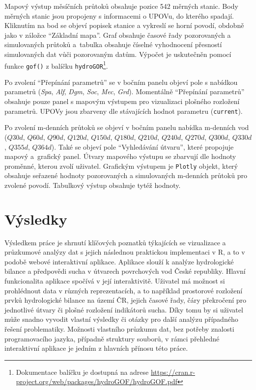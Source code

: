 \documentclass[12pt,]{article}
\let\rmarkdownfootnote\footnote%
\def\footnote{\protect\rmarkdownfootnote}
\begin{document}
\vspace*{-0.3cm}

\qquad Mapový výstup měsíčních průtoků obsahuje pozice 542 měrných
stanic. Body měrných stanic jsou propojeny s informacemi o UPOVu, do
kterého spadají. Kliknutím na bod se objeví popisek stanice a vykreslí
se horní povodí, obdobně jako v záložce \enquote{Základní mapa}. Graf
obsahuje časové řady pozorovaných a simulovaných průtoků a~tabulka
obsahuje číselné vyhodnocení přesností simulovaných dat vůči pozorovaným
datům. Výpočet je uskutečněn pomocí funkce \texttt{gof()} z balíčku
\texttt{hydroGOR}\footnote{Dokumentace balíčku je dostupná na adrese
  \url{https://cran.r-project.org/web/packages/hydroGOF/hydroGOF.pdf}}.

\qquad Po zvolení \enquote{Přepínání parametrů} se v bočním panelu
objeví pole s nabídkou parametrů (\emph{Spa}, \emph{Alf}, \emph{Dgm},
\emph{Soc}, \emph{Mec}, \emph{Grd}). Momentálně \enquote{Přepínání
parametrů} obsahuje pouze panel s mapovým výstupem pro vizualizaci
plošného rozložení parametrů. UPOVy jsou zbarveny dle stávajících hodnot
parametru (\texttt{current}).

\qquad Po zvolení m-denních průtoků se objeví v bočním panelu nabídka
m-denních vod (\(Q30d\), \(Q60d\), \(Q90d\), \(Q120d\), \(Q150d\),
\(Q180d\), \(Q210d\), \(Q240d\), \(Q270d\), \(Q300d\), \(Q330d\),
\(Q355d\), \(Q364d\)). Také se objeví pole \enquote{Vyhledávání útvaru},
které propojuje mapový a~grafický panel. Útvary mapového výstupu se
zbarvují dle hodnoty proměnné, kterou zvolí uživatel. Grafickým výstupem
je \texttt{Plotly} objekt, který obsahuje seřazené hodnoty pozorovaných
a simulovaných m-denních průtoků pro zvolené povodí. Tabulkový výstup
obsahuje tytéž hodnoty.

\newpage

\section*{Výsledky}\label{vysledky}

\qquad Výsledkem práce je shrnutí klíčových poznatků týkajících se
vizualizace a průzkumové analýzy dat s jejich následnou praktickou
implementaci v R, a to v podobě webové interaktivní aplikace. Aplikace
slouží k analýze hydrologické bilance a předpovědi sucha v útvarech
povrchových vod České republiky. Hlavní funkcionalita aplikace spočívá v
její interaktivitě. Uživatel má možnost si prohlédnout data v různých
reprezentacích, a to například prostorové rozložení prvků hydrologické
bilance na území ČR, jejich časové řady, čáry překročení pro jednotlivé
útvary či plošné rozložení indikátorů sucha. Díky tomu by si uživatel
může snadno vyvodit vlastní výsledky či otázky pro další analýzu
případného řešení problematiky. Možnosti vlastního průzkumu dat, bez
potřeby znalosti programovacího jazyka, případně struktury souborů, v
rámci přehledné interaktivní aplikace je jedním z hlavních přínosu této
práce.
\end{document}
